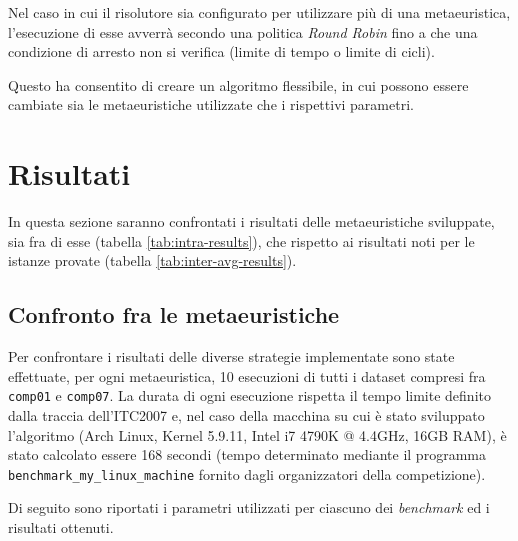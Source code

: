 \documentclass[]{article}
\begin{document}
Nel caso in cui il risolutore sia configurato per utilizzare più di una metaeuristica, l'esecuzione di esse avverrà secondo una politica \textit{Round Robin} fino a che una condizione di arresto non si verifica (limite di tempo o limite di cicli).

Questo ha consentito di creare un algoritmo flessibile, in cui possono essere cambiate sia le metaeuristiche utilizzate che i rispettivi parametri.


\section{Risultati}\label{sec:risultati}

In questa sezione saranno confrontati i risultati delle metaeuristiche sviluppate, sia fra di esse  (tabella \ref{tab:intra-results}), che rispetto ai risultati noti per le istanze provate (tabella \ref{tab:inter-avg-results}).

\subsection{Confronto fra le metaeuristiche}
Per confrontare i risultati delle diverse strategie implementate sono state effettuate, per ogni metaeuristica, 10 esecuzioni di tutti i dataset compresi fra \texttt{comp01} e \texttt{comp07}.
La durata di ogni esecuzione rispetta il tempo limite definito dalla traccia dell'ITC2007 e, nel caso della macchina su cui è stato sviluppato l'algoritmo (Arch Linux, Kernel 5.9.11, Intel i7 4790K @ 4.4GHz, 16GB RAM), è stato calcolato essere 168 secondi (tempo determinato mediante il programma \texttt{benchmark\_my\_linux\_machine} fornito dagli organizzatori della competizione).

Di seguito sono riportati i parametri utilizzati per ciascuno dei \textit{benchmark} ed i risultati ottenuti.
\end{document}
